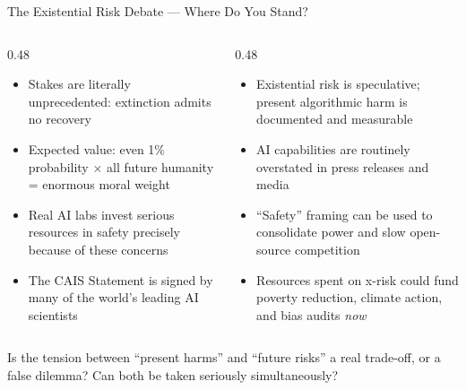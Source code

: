 \documentclass[aspectratio=169,11pt]{beamer}
\begin{document}
\begin{frame}[shrink=16]{The Existential Risk Debate --- Where Do You Stand?}
\begin{columns}[T]
\begin{column}{0.48\textwidth}
\begin{probox}
\scriptsize
\begin{itemize}
    \item Stakes are literally unprecedented: extinction admits no recovery
    \item Expected value: even 1\% probability $\times$ all future humanity = enormous moral weight
    \item Real AI labs invest serious resources in safety precisely because of these concerns
    \item The CAIS Statement is signed by many of the world's leading AI scientists
\end{itemize}
\end{probox}
\end{column}
\begin{column}{0.48\textwidth}
\begin{objectionbox}
\scriptsize
\begin{itemize}
    \item Existential risk is speculative; present algorithmic harm is documented and measurable
    \item AI capabilities are routinely overstated in press releases and media
    \item ``Safety'' framing can be used to consolidate power and slow open-source competition
    \item Resources spent on x-risk could fund poverty reduction, climate action, and bias audits \emph{now}
\end{itemize}
\end{objectionbox}
\end{column}
\end{columns}

\vspace{0.2cm}
\begin{discussionbox}[Discussion]
\scriptsize
Is the tension between ``present harms'' and ``future risks'' a real trade-off, or a false dilemma? Can both be taken seriously simultaneously?
\end{discussionbox}
\end{frame}

\end{document}
